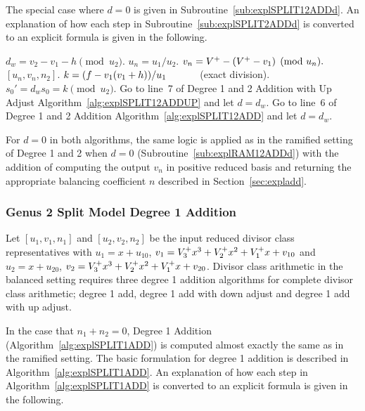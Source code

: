 The special case where $d=0$ is given in Subroutine~\ref{sub:explSPLIT12ADDd}. An
explanation of how each step in Subroutine~\ref{sub:explSPLIT2ADDd} is converted
to an explicit formula is given in the following. 

\begin{subroutine}[htbp]
\caption{Genus 2 Split Model Degree 1 and 2 Addition ($d = 0$) \label{sub:explSPLIT12ADDd}}
\begin{algorithmic} [1]
\State $d_w = v_2 - v_1 - h \pmod{u_2}$.
    \State $u_n = u_1/u_2$.
    \State $v_n = V^{+} - (V^{+} - v_1) \pmod{u_n}.$
    \State \Return $[u_n,v_n,n_2]$.
\Else 
    \State $k = (f - v_1(v_1 + h))/u_1 \quad\quad\quad$ (exact division).
    \State $s_0' = d_ws_0 = k \pmod{u_2}$.
        \State Go to line~7 of Degree 1 and 2 Addition with Up Adjust Algorithm~\ref{alg:explSPLIT12ADDUP} and let $d = d_w$.
    \Else 
        \State Go to line~6 of Degree 1 and 2 Addition Algorithm~\ref{alg:explSPLIT12ADD} and let $d = d_w$.
    \EndIf
\EndIf
\end{algorithmic}
\end{subroutine}


For $d=0$ in both algorithms, the same logic is applied as in the ramified
setting of Degree 1 and 2 when $d=0$ (Subroutine~\ref{sub:explRAM12ADDd}) with the
addition of computing the output $v_{n}$ in positive reduced basis and returning
the appropriate balancing coefficient $n$ described in
Section~\ref{sec:expladd}.



\subsubsection{Genus 2 Split Model Degree 1 Addition}
Let $[u_1,v_1,n_1]$ and $[u_2,v_2,n_2]$ be the input reduced divisor class
representatives with $u_1 = x + u_{10}$, $v_1 = V^{+}_3x^3 + V^{+}_2x^2 + V^{+}_1x +
v_{10}$ and $u_2 = x + u_{20}$, $v_2 = V^{+}_3x^3 + V^{+}_2x^2 + V^{+}_1x + v_{20}$.
Divisor class arithmetic in the balanced setting requires three degree 1
addition algorithms for complete divisor class arithmetic; degree 1 add, degree
1 add with down adjust and degree 1 add with up adjust. 

In the case that $n_1 + n_2 = 0$, Degree 1 Addition
(Algorithm~\ref{alg:explSPLIT1ADD}) is computed almost exactly the same as in the
ramified setting. The basic formulation for degree 1 addition is described in
Algorithm~\ref{alg:explSPLIT1ADD}. An explanation of how each step in
Algorithm~\ref{alg:explSPLIT1ADD} is converted to an explicit formula is given
in the following.

